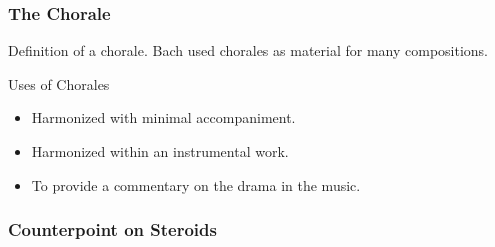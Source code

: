 	
	\begin{frame}
		\frametitle{The Chorale}
		Definition of a chorale.
		Bach used chorales as material for many compositions.
		
		\begin{block}{Uses of Chorales}
			\begin{itemize}
				\item Harmonized with minimal accompaniment.
				\item Harmonized within an instrumental work.
				\item To provide a commentary on the drama in the music.
			\end{itemize}
		\end{block}
	\end{frame}
	
	
	\begin{frame}
		\frametitle{Counterpoint on Steroids}
	\end{frame}
	
	